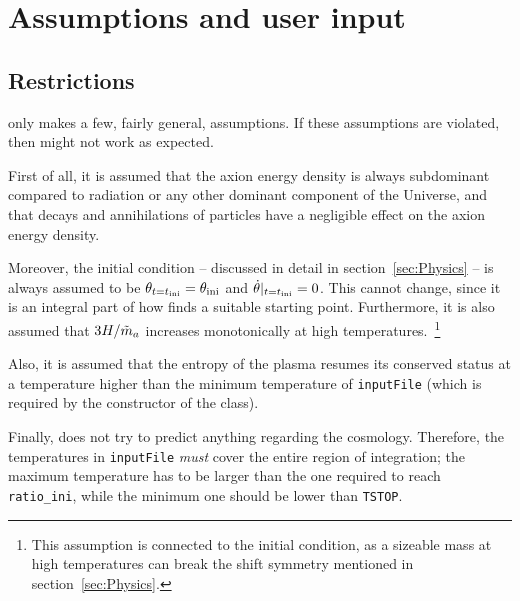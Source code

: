 \documentclass[11pt,a4paper]{article}
\begin{document}
\section{Assumptions and user input}\label{sec:assumptions}
\setcounter{equation}{0}
%
\subsection{Restrictions}\label{sec:restrictions}
\mimes only makes a few, fairly general, assumptions. If these assumptions are violated, then \mimes might not work as expected.

First of all, it is assumed that the axion energy density is always subdominant compared to radiation or any other dominant component of the Universe, and that decays and annihilations of particles have a negligible effect on the axion energy density. 

Moreover, the initial condition -- discussed in detail in section~\ref{sec:Physics} -- is always assumed to be $\theta_{t=t_{\rm ini}{}} = \theta_{\rm ini}{}$ and $\dot \theta|_{t=t_{\rm ini}{}}=0$. This cannot change, since it is an integral part of how \mimes finds a suitable starting point. Furthermore, it is also assumed that $3H/\tilde m_{a}{}$ increases monotonically at high temperatures.~\footnote{This assumption is connected to the initial condition, as a sizeable mass at high temperatures can break the shift symmetry mentioned in section~\ref{sec:Physics}.} 

Also, it is assumed that the entropy of the plasma resumes its conserved status at a temperature higher than the minimum temperature of {\tt inputFile} (which is required by the constructor of the  class).  

Finally, \mimes does not try to predict anything regarding the cosmology. Therefore, the temperatures in {\tt inputFile} {\em must} cover the entire region of  integration; \ie the maximum temperature has to be larger than the one required to reach {\tt ratio\_ini}, while the minimum one should be lower than {\tt TSTOP}.
\end{document}
